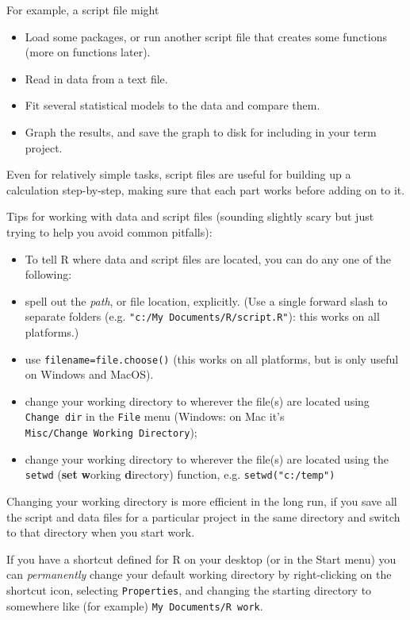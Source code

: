 \documentclass[11pt,]{article}
\begin{document}
For example, a script file might

\begin{itemize}
\item
  Load some packages, or run another script file that creates some
  functions (more on functions later).
\item
  Read in data from a text file.
\item
  Fit several statistical models to the data and compare them.
\item
  Graph the results, and save the graph to disk for including in your
  term project.
\end{itemize}

Even for relatively simple tasks, script files are useful for building
up a calculation step-by-step, making sure that each part works before
adding on to it.

Tips for working with data and script files (sounding slightly scary but
just trying to help you avoid common pitfalls):

\begin{itemize}
\item
  To tell R where data and script files are located, you can do any one
  of the following:
\item
  spell out the \emph{path}, or file location, explicitly. (Use a single
  forward slash to separate folders (e.g.
  \texttt{"c:/My\ Documents/R/script.R"}): this works on all platforms.)
\item
  use \texttt{filename=file.choose()} (this works on all platforms, but
  is only useful on Windows and MacOS).
\item
  change your working directory to wherever the file(s) are located
  using \texttt{Change\ dir} in the \texttt{File} menu (Windows: on Mac
  it's \texttt{Misc/Change\ Working\ Directory});
\item
  change your working directory to wherever the file(s) are located
  using the \texttt{setwd} (\textbf{set} \textbf{w}orking
  \textbf{d}irectory) function, e.g. \texttt{setwd("c:/temp")}
\end{itemize}

Changing your working directory is more efficient in the long run, if
you save all the script and data files for a particular project in the
same directory and switch to that directory when you start work.

If you have a shortcut defined for R on your desktop (or in the Start
menu) you can \emph{permanently} change your default working directory
by right-clicking on the shortcut icon, selecting \texttt{Properties},
and changing the starting directory to somewhere like (for example)
\texttt{My\ Documents/R\ work}.
\end{document}
